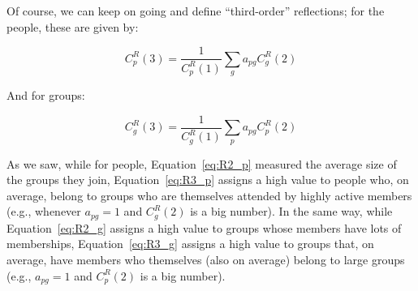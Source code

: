 \documentclass[a4paper,fleqn]{cas-sc}
\begin{document}
Of course, we can keep on going and define ``third-order'' reflections; for the people, these are given by:

\begin{equation}
   C^R_p(3) = \frac{1}{C^R_p(1)}\sum_g a_{pg}C^R_g(2)
   \label{eq:R3_p}
\end{equation}

And for groups:

\begin{equation}
   C^R_g(3) = \frac{1}{C^R_g(1)}\sum_p a_{pg}C^R_p(2)
   \label{eq:R3_g}
\end{equation}

As we saw, while for people, Equation~\ref{eq:R2_p} measured the average size of the groups they join, Equation~\ref{eq:R3_p} assigns a high value to people who, on average, belong to groups who are themselves attended by highly active members (e.g., whenever $a_{pg} = 1$ and $C^R_g(2)$ is a big number). In the same way, while Equation~\ref{eq:R2_g} assigns a high value to groups whose members have lots of memberships, Equation~\ref{eq:R3_g} assigns a high value to groups that, on average, have members who themselves (also on average) belong to large groups (e.g., $a_{pg} = 1$ and $C^R_p(2)$ is a big number).
\end{document}
